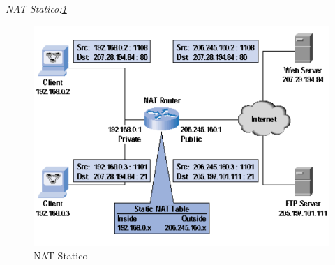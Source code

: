 \documentclass[12pt]{article}
\begin{document}
		\textit{NAT Statico:\ref{fig:2}}
		\begin{figure}[h!]
			\centering
			\includegraphics[scale=0.40]{img/static.PNG}
			\caption{NAT Statico\label{fig:2}}
		\end{figure}
		
\end{document}
